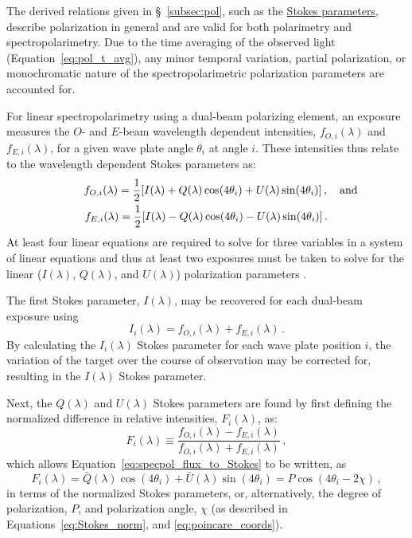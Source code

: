 The derived relations given in \S~\ref{subsec:pol}, such as the \hyperref[eq:Stokes_params]{Stokes parameters}, describe polarization in general and are valid for both polarimetry and spectropolarimetry. Due to the time averaging of the observed light (Equation~\ref{eq:pol_t_avg}), any minor temporal variation, partial polarization, or monochromatic nature of the spectropolarimetric polarization parameters are accounted for.

For linear spectropolarimetry using a dual-beam polarizing element, an exposure measures the $O$- and $E$-beam wavelength dependent intensities, $f_{O, i}(\lambda)$ and $f_{E, i}(\lambda)$, for a given wave plate angle $\theta_{i}$ at angle $i$. These intensities thus relate to the wavelength dependent Stokes parameters as:
\begin{equation}
    \begin{gathered}
        f_{O, i}(\lambda) = \frac{1}{2} [I(\lambda) + Q(\lambda)\cos(4\theta_{i}) + U(\lambda)\sin(4\theta_{i})]\,,\rlap{\quad and} \\
        f_{E, i}(\lambda) = \frac{1}{2} [I(\lambda) - Q(\lambda)\cos(4\theta_{i}) - U(\lambda)\sin(4\theta_{i})]\,.
    \end{gathered}\label{eq:specpol_flux_to_Stokes}
\end{equation}
At least four linear equations are required to solve for three variables in a system of linear equations and thus at least two exposures must be taken to solve for the linear ($I(\lambda)$, $Q(\lambda)$, and $U(\lambda)$) polarization parameters \citep{pol_std, keller_instr}.

The first Stokes parameter, $I(\lambda)$, may be recovered for each dual-beam exposure using
\begin{equation}
    I_{i}(\lambda) = f_{O, i}(\lambda) + f_{E, i}(\lambda)\,.\label{eq:specpol_I_calc}
\end{equation}
By calculating the $I_{i}(\lambda)$ Stokes parameter for each wave plate position $i$, the variation of the target over the course of observation may be corrected for, resulting in the $I(\lambda)$ Stokes parameter.

Next, the $Q(\lambda)$ and $U(\lambda)$ Stokes parameters are found by first defining the normalized difference in relative intensities, $F_{i}(\lambda)$, as:
\begin{equation}
    F_{i}(\lambda) \equiv \frac{f_{O, i}(\lambda) - f_{E, i}(\lambda)}{f_{O, i}(\lambda) + f_{E, i}(\lambda)}\,,\label{eq:specpol_norm_flux}
\end{equation}
which allows Equation~\ref{eq:specpol_flux_to_Stokes} to be written, as
\begin{equation}
    F_{i}(\lambda) = \bar{Q}(\lambda) \cos(4\theta_{i}) + \bar{U}(\lambda) \sin(4\theta_{i}) = P\cos(4\theta_{i} - 2\chi)\,,\label{eq:specpol_F_to_params}
\end{equation}
in terms of the normalized Stokes parameters, or, alternatively, the degree of polarization, $P$, and polarization angle, $\chi$ (as described in Equations~\ref{eq:Stokes_norm}, and \ref{eq:poincare_coords}).

